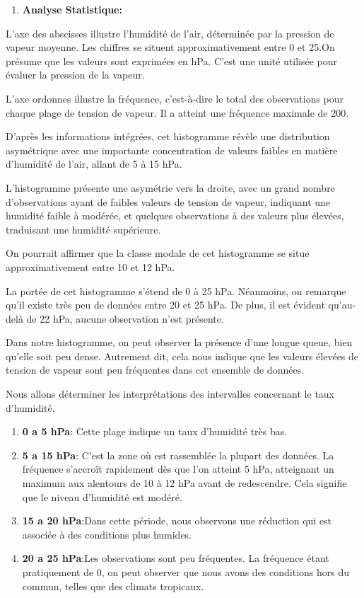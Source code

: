 \documentclass[
]{article}
\providecommand{\tightlist}{%
  \setlength{\itemsep}{0pt}\setlength{\parskip}{0pt}}
\begin{document}
\begin{enumerate}
\def\labelenumi{\arabic{enumi}.}
\setcounter{enumi}{1}
\tightlist
\item
  \textbf{Analyse Statistique:}
\end{enumerate}

L'axe des abscisses illustre l'humidité de l'air, déterminée par la
pression de vapeur moyenne. Les chiffres se situent approximativement
entre 0 et 25.On présume que les valeurs sont exprimées en hPa. C'est
une unité utilisée pour évaluer la pression de la vapeur.

L'axe ordonnes illustre la fréquence, c'est-à-dire le total des
observations pour chaque plage de tension de vapeur. Il a atteint une
fréquence maximale de 200.

D'après les informations intégrées, cet histogramme révèle une
distribution asymétrique avec une importante concentration de valeurs
faibles en matière d'humidité de l'air, allant de 5 à 15 hPa.

L'histogramme présente une asymétrie vers la droite, avec un grand
nombre d'observations ayant de faibles valeurs de tension de vapeur,
indiquant une humidité faible à modérée, et quelques observations à des
valeurs plus élevées, traduisant une humidité supérieure.

On pourrait affirmer que la classe modale de cet histogramme se situe
approximativement entre 10 et 12 hPa.

La portée de cet histogramme s'étend de 0 à 25 hPa. Néanmoins, on
remarque qu'il existe très peu de données entre 20 et 25 hPa. De plus,
il est évident qu'au-delà de 22 hPa, aucune observation n'est présente.

Dans notre histogramme, on peut observer la présence d'une longue queue,
bien qu'elle soit peu dense. Autrement dit, cela nous indique que les
valeurs élevées de tension de vapeur sont peu fréquentes dans cet
ensemble de données.

Nous allons déterminer les interprétations des intervalles concernant le
taux d'humidité.

\begin{enumerate}
\def\labelenumi{\arabic{enumi}.}
\tightlist
\item
  \textbf{0 a 5 hPa}: Cette plage indique un taux d'humidité très bas.
\item
  \textbf{5 a 15 hPa}: C'est la zone où est rassemblée la plupart des
  données. La fréquence s'accroît rapidement dès que l'on atteint 5 hPa,
  atteignant un maximum aux alentours de 10 à 12 hPa avant de
  redescendre. Cela signifie que le niveau d'humidité est modéré.
\item
  \textbf{15 a 20 hPa}:Dans cette période, nous observons une réduction
  qui est associée à des conditions plus humides.
\item
  \textbf{20 a 25 hPa}:Les observations sont peu fréquentes. La
  fréquence étant pratiquement de 0, on peut observer que nous avons des
  conditions hors du commun, telles que des climats tropicaux.
\end{enumerate}
\end{document}
